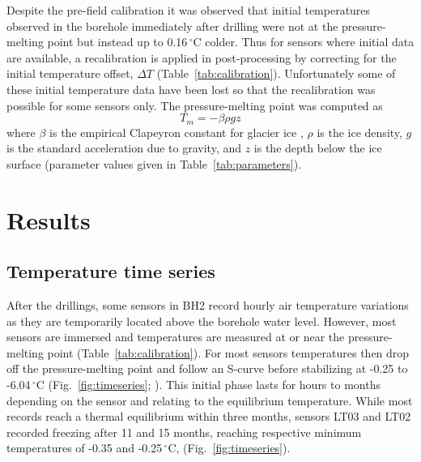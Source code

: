 \documentclass[utf8]{article}
\begin{document}
    Despite the pre-field calibration it was observed that initial temperatures
    observed in the borehole immediately after drilling were not at the
    pressure-melting point but instead up to 0.16\,$^\circ$C colder.  Thus for
    sensors where initial data are available, a recalibration is applied in
    post-processing by correcting for the initial temperature offset, $\Delta
    T$ (Table~\ref{tab:calibration}). Unfortunately some of these initial
    temperature data have been lost so that the recalibration was possible for
    some sensors only. The pressure-melting point was computed as
    \begin{equation}
      T_m = -\beta \rho g z
    \end{equation}
    where $\beta$ is the empirical Clapeyron constant for glacier ice
    \citep{Luthi.etal.2002}, $\rho$ is the ice density, $g$ is the standard
    acceleration due to gravity, and $z$ is the depth below the ice surface
    (parameter values given in Table~\ref{tab:parameters}).


\section{Results}

\subsection{Temperature time series}

    After the drillings, some sensors in BH2 record hourly air temperature
    variations as they are temporarily located above the borehole water level.
    However, most sensors are immersed and temperatures are measured at or near
    the pressure-melting point (Table~\ref{tab:calibration}). For most sensors
    temperatures then drop off the pressure-melting point and follow an S-curve
    before stabilizing at -0.25 to -6.04\,$^\circ$C
    (Fig.~\ref{fig:timeseries}; \citealp[cf.][Fig.~3.6]{Ryser.2014}). This
    initial phase lasts for hours to months
    depending on the sensor and relating to the equilibrium temperature. While
    most records reach a thermal equilibrium within three months, sensors LT03
    and LT02 recorded freezing after 11 and 15 months, reaching respective
    minimum temperatures of -0.35 and -0.25\,$^\circ$C,
    (Fig.~\ref{fig:timeseries}).
\end{document}
